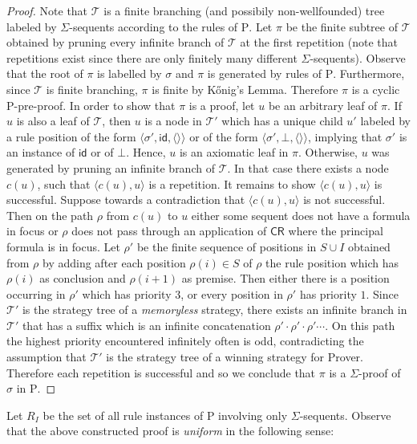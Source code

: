 \documentclass{myifcolog}
\newcommand\C {C}
\newcommand{\hickp}{\mathrm{P}}
\numberwithin{theorem}{section}
\begin{document}
\begin{proof}
        Note that $\mathcal{T}$ is a finite branching (and possibily non-wellfounded) tree labeled by $\Sigma$-sequents according to the rules of $\hickp$. Let $\pi$ be the finite subtree of $\mathcal{T}$ obtained by pruning every infinite branch of $\mathcal{T}$ at the first repetition (note that repetitions exist since there are only finitely many different $\Sigma$-sequents). Observe that the root of $\pi$ is labelled by $\sigma$ and $\pi$ is generated by rules of $\hickp$. Furthermore, since $\mathcal{T}$ is finite branching, $\pi$ is finite by K\H{o}nig's Lemma. Therefore $\pi$ is a cyclic $\hickp$-pre-proof. In order to show that $\pi$ is a proof, let $u$ be an arbitrary leaf of $\pi$. If $u$ is also a leaf of $\mathcal{T}$, then $u$ is a node in $\mathcal{T}'$ which has a unique child $u'$ labeled by a rule position of the form $\langle \sigma', \mathsf{id}, \langle \rangle \rangle$ or of the form $\langle \sigma', \bot, \langle \rangle \rangle$, implying that $\sigma'$ is an instance of $\mathsf{id}$ or of $\bot$. Hence, $u$ is an axiomatic leaf in $\pi$. Otherwise, $u$ was generated by pruning an infinite branch of $\mathcal{T}$. In that case there exists a node $c(u)$, such that $\langle c(u), u \rangle$ is a repetition. It remains to show $\langle c(u), u \rangle$ is successful. Suppose towards a contradiction that $\langle c(u), u \rangle$ is not successful. Then on the path $\rho$ from $c(u)$ to $u$ either some sequent does not have a formula in focus or $\rho$ does not pass through an application of $\mathsf{\C R}$ where the principal formula is in focus. Let $\rho'$ be the finite sequence of positions in $S \cup I$ obtained from $\rho$ by adding after each position $\rho(i) \in S$ of $\rho$ the rule position which has $\rho(i)$ as conclusion and $\rho(i+1)$ as premise. Then either there is a position occurring in $\rho'$ which has priority $3$, or every position in $\rho'$ has priority $1$. Since $\mathcal{T}'$ is the strategy tree of a \emph{memoryless} strategy, there exists an infinite branch in $\mathcal{T}'$ that has a suffix which is an infinite concatenation $\rho' \cdot \rho' \cdot \rho' \cdots$. On this path the highest priority encountered infinitely often is odd, contradicting the assumption that $\mathcal{T}'$ is the strategy tree of a winning strategy for Prover. Therefore each repetition is successful and so we conclude that $\pi$ is a $\Sigma$-proof of $\sigma$ in $\hickp$.
	\end{proof}
	
	Let $R_I$ be the set of all rule instances of $\hickp$ involving only $\Sigma$-sequents. Observe that the above constructed proof is \emph{uniform} in the following sense:
	
\end{document}
